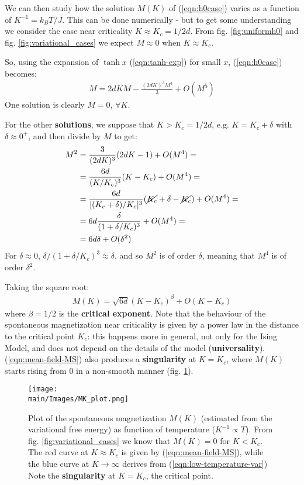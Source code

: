 \documentclass[../../main.tex]{subfiles}
\begin{document}
\medskip

We can then study how the solution $M(K)$ of (\ref{eqn:h0case}) varies as a function of $K^{-1} = k_B T/J$. This can be done numerically - but to get some understanding we consider the case near criticality $K \approx K_c = 1/2d$. From fig. \ref{fig:uniformh0} and fig. \ref{fig:variational_cases} we expect $M \approx 0$ when $K \approx K_c$.

\medskip

So, using the expansion of $\tanh x$ (\ref{eqn:tanh-exp}) for small $x$, (\ref{eqn:h0case}) becomes:
\begin{align*}
    M = 2dKM- \frac{(2dK)^3 M^3}{3} + O(M^5) 
\end{align*}
One solution is clearly $M=0$, $\forall K$. 

For the other \textbf{solutions}, we suppose that $K > K_c = 1/2d$, e.g. $K = K_c + \delta$ with $\delta \approx 0^+$, and then divide by $M$ to get:
\begin{align*}
    M^2 &= \frac{3}{(2dK)^3}(2dK-1) + O(M^4) =\\
        &= \frac{6d}{(K/K_c)^3} (K-K_c)  + O(M^4) =\\
        &= \frac{6d}{[(K_c + \delta)/K_c]^3} (\cancel{K_c}+\delta - \cancel{K_c}) + O(M^4) =\\
        &= 6d \frac{\delta}{(1+ \delta/K_c)^3} + O(M^4) =\\
        &= 6d \delta + O(\delta^2)
\end{align*}
For $\delta \approx 0$, $\delta/(1+ \delta/K_c)^3 \approx \delta$, and so $M^2$ is of order $\delta$, meaning that $M^4$ is of order $\delta^2$. 

Taking the square root:
\begin{align}\label{eqn:mean-field-MS}
    M(K) = \sqrt{6d} (K-K_c)^\beta + O(K-K_c)
\end{align}
where $\beta = 1/2$ is the \textbf{critical exponent}. Note that the behaviour of the spontaneous magnetization near criticality is given by a power law in the distance to the critical point $K_c$: this happens more in general, not only for the Ising Model, and does not depend on the details of the model  (\textbf{universality}). (\ref{eqn:mean-field-MS}) also produces a \textbf{singularity} at $K=K_c$, where $M(K)$ starts rising from $0$ in a non-smooth manner (fig. \ref{fig:MK_plot}).

\begin{figure}[H]
    \centering
    \texttt{[image: \\main/Images/MK\_plot.png]}
    \caption{Plot of the spontaneous magnetization $M(K)$ (estimated from the variational free energy) as function of temperature ($K^{-1} \propto T$).
    From fig. \ref{fig:variational_cases} we know that $M(K) = 0$ for $K < K_c$. The red curve at $K \approx K_c$ is given by (\ref{eqn:mean-field-MS}), while the blue curve at $K \to \infty$ derives from (\ref{eqn:low-temperature-var})
    Note the \textbf{singularity} at $K=K_c$, the critical point. }
    \label{fig:MK_plot}
\end{figure}
\end{document}
